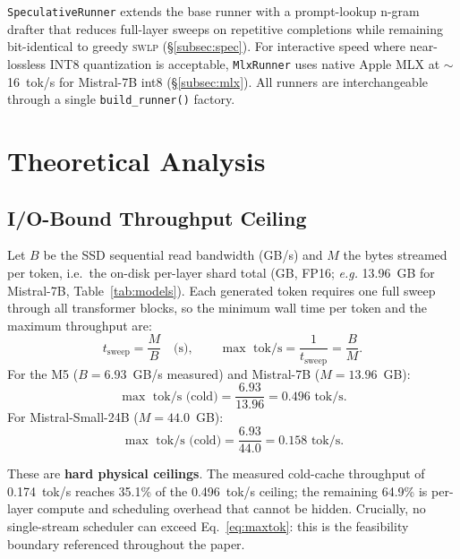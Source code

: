 \documentclass[10pt,a4paper]{article}
\newcommand{\swlp}{\textsc{swlp}}
\newcommand{\eg}{\textit{e.g.}}
\begin{document}
\texttt{SpeculativeRunner} extends the base runner with a prompt-lookup n-gram
drafter that reduces full-layer sweeps on repetitive completions while remaining
bit-identical to greedy \swlp{} (\S\ref{subsec:spec}). For interactive speed where
near-lossless INT8 quantization is acceptable, \texttt{MlxRunner} uses native
Apple MLX at $\sim$16~tok/s for Mistral-7B int8 (\S\ref{subsec:mlx}). All runners
are interchangeable through a single \texttt{build\_runner()} factory.

\section{Theoretical Analysis}
\label{sec:theory}

\subsection{I/O-Bound Throughput Ceiling}
\label{subsec:ceiling}

Let $B$ be the SSD sequential read bandwidth (GB/s) and $M$ the bytes streamed per token, i.e.\ the on-disk per-layer shard total (GB,
FP16; \eg{} 13.96~GB for Mistral-7B, Table~\ref{tab:models}). Each generated token requires one full sweep through all transformer
blocks, so the minimum wall time per token and the maximum throughput are:
\begin{equation}
t_{\text{sweep}} = \frac{M}{B} \quad \text{(s)},
\qquad
\max \text{ tok/s} = \frac{1}{t_{\text{sweep}}} = \frac{B}{M}.
\label{eq:maxtok}
\end{equation}
For the M5 ($B = 6.93$~GB/s measured) and Mistral-7B ($M = 13.96$~GB):
\begin{equation}
\max \text{ tok/s (cold)} = \frac{6.93}{13.96} = 0.496 \text{ tok/s}.
\label{eq:mistral7b}
\end{equation}
For Mistral-Small-24B ($M = 44.0$~GB):
\begin{equation}
\max \text{ tok/s (cold)} = \frac{6.93}{44.0} = 0.158 \text{ tok/s}.
\label{eq:mistral24b}
\end{equation}

These are \textbf{hard physical ceilings}. The measured cold-cache throughput of
0.174~tok/s reaches 35.1\% of the 0.496~tok/s ceiling; the remaining 64.9\% is
per-layer compute and scheduling overhead that cannot be hidden. Crucially, no
single-stream scheduler can exceed Eq.~\ref{eq:maxtok}: this is the feasibility
boundary referenced throughout the paper.
\end{document}
